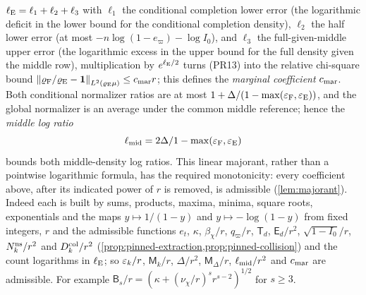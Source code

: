$\ell_{\rm E}=\ell_1+\ell_2+\ell_3$ with $\ell_1$ the
conditional completion lower error (the logarithmic deficit in
the lower bound for the conditional completion density),
$\ell_2$ the half lower error (at most
$-n\log(1-e_\varpi)-\log I_0$), and $\ell_3$ the
full-given-middle upper error (the logarithmic excess in the
upper bound for the full density given the middle row),
multiplication by $e^{\ell_{\rm E}/2}$ turns (PR13) into
the relative chi-square bound $\left\|\varrho_{\rm F}/\varrho_{\rm E}-\mathbf 1\right\|_{L^2(\varrho_{\rm
E}\mu)}\le c_{\rm mar}r$; this defines the \emph{marginal coefficient} $c_{\rm mar}$. Both
conditional normalizer ratios are at most $1+\Delta/(1-\max(\varepsilon_{\rm F},\varepsilon_{\rm E}))$,
and the global normalizer is an average under the common middle reference; hence the
\emph{middle log ratio}
\[
 \ell_{\rm mid}=2\Delta/1-\max(\varepsilon_{\rm F},\varepsilon_{\rm E})
\]
bounds both middle-density log ratios. This linear majorant, rather than a pointwise
logarithmic formula, has the required monotonicity: every coefficient above, after its
indicated power of $r$ is removed, is admissible (\cref{lem:majorant}). Indeed each is
built by sums, products, maxima, minima, square roots, exponentials and the maps
$y\mapsto1/(1-y)$ and $y\mapsto-\log(1-y)$ from fixed integers, $r$ and the admissible
functions $e_t$, $\kappa$, $\beta_\chi/r$, $q_\varpi/r$, $\mathsf T_d$, $\mathsf E_d/r^2$,
$\sqrt{1-I_0}/r$, $N^{\rm ns}_k/r^2$ and $D^{\rm col}_k/r^2$
(\cref{prop:pinned-extraction,prop:pinned-collision}) and the count logarithms in
$\ell_{\rm E}$; so $\varepsilon_k/r$, $\mathsf M_k/r$, $\Delta/r^2$, $\mathsf M_\Delta/r$,
$\ell_{\rm mid}/r^2$ and $c_{\rm mar}$ are admissible. For example
$\mathsf B_s/r=(\kappa+(\nu_\chi/r)^sr^{s-2})^{1/2}$ for $s\ge3$.

